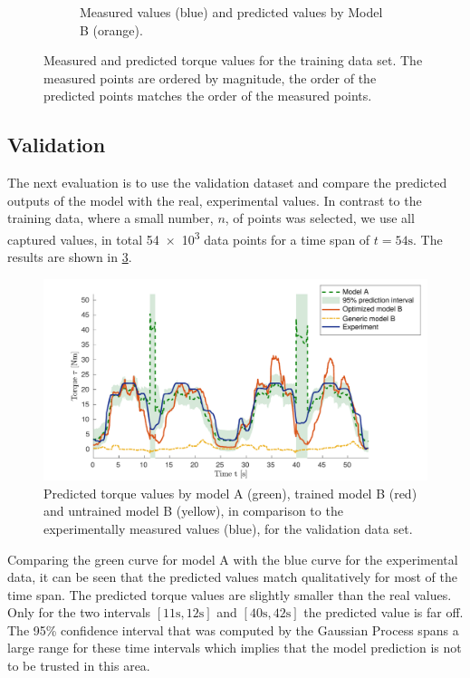 \begin{figure}
\begin{subfigure}[t]{0.48\textwidth}
    \caption{Measured values (blue) and predicted values by Model B (orange).}%
    \label{fig:measured_optimized_torque_B}%
  \end{subfigure}%
  \caption{Measured and predicted torque values for the training data set. The measured points are ordered by magnitude, the order of the predicted points matches the order of the measured points.}%
  \label{fig:measured_optimized_torque}%
\end{figure}%

\subsection{Validation}\label{sec:res_validation}

The next evaluation is to use the validation dataset and compare the predicted outputs of the model with the real, experimental values.
In contrast to the training data, where a small number, $n$, of points was selected, we use all captured values, in total \num{54e3} data points for a time span of $t=54 \si{\second}$. The results are shown in \cref{fig:validation_bv5_40_points}.

\begin{figure}%
  \centering%
  \includegraphics[width=\textwidth]{images/summer_school_study/validation_bv5_40_points.pdf}%
  \caption{Predicted torque values by model A (green), trained model B (red) and untrained model B (yellow), in comparison to the experimentally measured values (blue), for the validation data set.}%
  \label{fig:validation_bv5_40_points}%
\end{figure}%

Comparing the green curve for model A with the blue curve for the experimental data, it can be seen that the predicted values match qualitatively for most of the time span. The predicted torque values are slightly smaller than the real values. Only for the two intervals $[11 \si\second, 12 \si\second]$ and $[40 \si\second, 42 \si\second]$ the predicted value is far off. The 95\% confidence interval that was computed by the Gaussian Process spans a large range for these time intervals which implies that the model prediction is not to be trusted in this area. 

